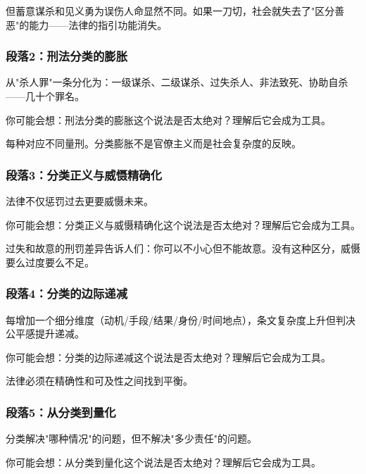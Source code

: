 \documentclass[a4paper,12pt]{book}
\begin{document}
但蓄意谋杀和见义勇为误伤人命显然不同。如果一刀切，社会就失去了"区分善恶"的能力——法律的指引功能消失。

	\subsubsection*{段落2：刑法分类的膨胀}
	从"杀人罪"一条分化为：一级谋杀、二级谋杀、过失杀人、非法致死、协助自杀——几十个罪名。
	\begin{tcolorbox}[colback=yellow!5, title=\textit{读者行为预测}]
		你可能会想：刑法分类的膨胀这个说法是否太绝对？理解后它会成为工具。
	\end{tcolorbox}

每种对应不同量刑。分类膨胀不是官僚主义而是社会复杂度的反映。

	\subsubsection*{段落3：分类正义与威慑精确化}
	法律不仅惩罚过去更要威慑未来。
	\begin{tcolorbox}[colback=yellow!5, title=\textit{读者行为预测}]
		你可能会想：分类正义与威慑精确化这个说法是否太绝对？理解后它会成为工具。
	\end{tcolorbox}

过失和故意的刑罚差异告诉人们：你可以不小心但不能故意。没有这种区分，威慑要么过度要么不足。

	\subsubsection*{段落4：分类的边际递减}
	每增加一个细分维度（动机/手段/结果/身份/时间地点），条文复杂度上升但判决公平感提升递减。
	\begin{tcolorbox}[colback=yellow!5, title=\textit{读者行为预测}]
		你可能会想：分类的边际递减这个说法是否太绝对？理解后它会成为工具。
	\end{tcolorbox}

法律必须在精确性和可及性之间找到平衡。

	\subsubsection*{段落5：从分类到量化}
	分类解决"哪种情况"的问题，但不解决"多少责任"的问题。
	\begin{tcolorbox}[colback=yellow!5, title=\textit{读者行为预测}]
		你可能会想：从分类到量化这个说法是否太绝对？理解后它会成为工具。
	\end{tcolorbox}
\end{document}
